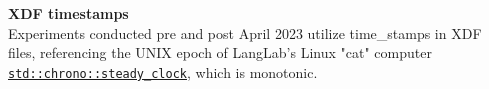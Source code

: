 \begin{description}
\begin{addmargin}[0em]{0em}
\end{addmargin}
\medskip
\begin{addmargin}[0em]{0em}
    \item\textbf{XDF timestamps\\}
    Experiments conducted pre and post April 2023 utilize time\_stamps in XDF files, referencing the UNIX epoch of LangLab's Linux "cat" computer \href{https://en.cppreference.com/w/cpp/chrono/steady_clock}{\texttt{std::chrono::steady\_clock}}, which is monotonic.
\end{addmargin}
    
\end{description}
